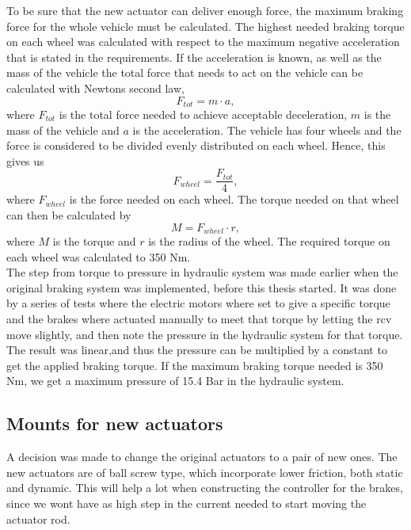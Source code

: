 \documentclass[a4paper,11pt]{kth-mag}
\begin{document}
To be sure that the new actuator can deliver enough force, the maximum braking force for the whole vehicle must be calculated. The highest needed braking torque on each wheel was calculated with respect to the maximum negative acceleration that is stated in the requirements. If the acceleration is known, as well as the mass of the vehicle the total force that needs to act on the vehicle can be calculated with Newtons second law, 
\begin{equation}
F_{tot}=m\cdot a,
\end{equation}
where $F_{tot}$ is the total force needed to achieve acceptable deceleration, $m$ is the mass of the vehicle and $a$ is the acceleration. The vehicle has four wheels and the force is considered to be divided evenly distributed on each wheel. Hence, this gives us 
\begin{equation}
F_{wheel}=\frac{F_{tot}}{4},
\end{equation}
where $F_{wheel}$ is the force needed on each wheel. The torque needed on that wheel can then be calculated by 
\begin{equation}
M=F_{wheel}\cdot r,
\end{equation}
where $M$ is the torque and $r$ is the radius of the wheel. The required torque on each wheel was calculated to 350 Nm.\\

The step from torque to pressure in hydraulic system was made earlier when the original braking system was implemented, before this thesis started. It was done by a series of tests where the electric motors where set to give a specific torque and the brakes where actuated manually to meet that torque by letting the \gls{rcv} move slightly, and then note the pressure in the hydraulic system for that torque. The result was linear,and thus the pressure can be multiplied by a constant to get the applied braking torque. If the maximum braking torque needed is 350 Nm, we get a maximum pressure of 15.4 Bar in the hydraulic system.


\subsection{Mounts for new actuators}

A decision was made to change the original actuators to a pair of new ones. The new actuators are of ball screw type, which incorporate lower friction, both static and dynamic. This will help a lot when constructing the controller for the brakes, since we wont have as high step in the current needed to start moving the actuator rod. \\
\end{document}
